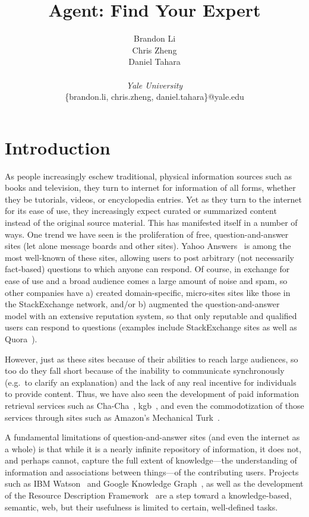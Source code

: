 \documentclass[11pt]{article}
\begin{document}
\title{Agent: Find Your Expert}
\author{
  Brandon Li\\
  Chris Zheng \\
  Daniel Tahara\\ \\
  {\it Yale University}\\
  \{brandon.li, chris.zheng, daniel.tahara\}@yale.edu
}
\renewcommand{\today}{}
\maketitle

\section{Introduction}
\label{sec:intro}
As people increasingly eschew traditional, physical information sources such as
books and television, they turn to internet for information of all forms,
whether they be tutorials, videos, or encyclopedia entries. Yet as they turn to
the internet for its ease of use, they increasingly expect curated or summarized
content instead of the original source material. This has manifested itself in a
number of ways. One trend we have seen is the proliferation of free,
question-and-answer sites (let alone message boards and other sites).  Yahoo
Answers~\cite{yahoo} is among the most well-known of these sites, allowing users to
post arbitrary (not necessarily fact-based) questions to which anyone can
respond. Of course, in exchange for ease of use and a broad audience comes a
large amount of noise and spam, so other companies have a) created
domain-specific, micro-sites sites like those in the StackExchange\cite{stackx}
network, and/or b) augmented the question-and-answer model with an extensive
reputation system, so that only reputable and qualified users can respond to
questions (examples include StackExchange sites as well as Quora~\cite{quora}).

However, just as these sites because of their abilities to reach large
audiences, so too do they fall short because of the inability to communicate
synchronously (e.g.\ to clarify an explanation) and the lack of any real
incentive for individuals to provide content. Thus, we have also seen the
development of paid information retrieval services such as
Cha-Cha~\cite{chacha}, kgb~\cite{kgb}, and even the commodotization of those
services through sites such as Amazon's Mechanical Turk~\cite{turk}.

A fundamental limitations of question-and-answer sites (and even the internet as
a whole) is that while it is a nearly infinite repository of information, it
does not, and perhaps cannot, capture the full extent of knowledge---the
understanding of information and associations between things---of the
contributing users. Projects such as IBM Watson~\cite{watson} and Google
Knowledge Graph~\cite{knowledge}, as well as the development of the Resource
Description Framework~\cite{rdf} are a step toward a knowledge-based, semantic,
web, but their usefulness is limited to certain, well-defined tasks.
\end{document}
